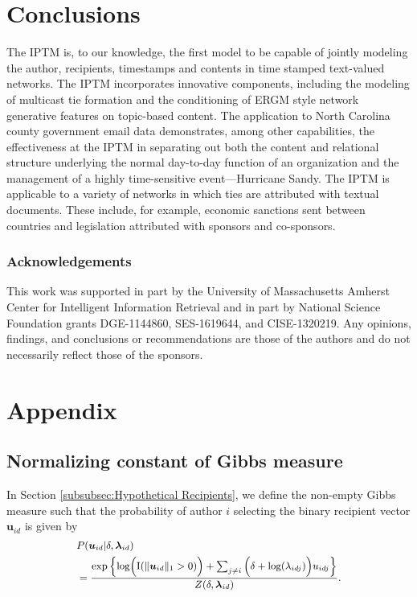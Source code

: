 \documentclass[twoside]{article}
\begin{document}
\section{Conclusions}\label{sec:Conclusions}
The IPTM is, to our knowledge, the first model to be capable of jointly modeling the author, recipients, timestamps and contents in time stamped text-valued networks. The IPTM incorporates innovative components, including the modeling of multicast tie formation and the conditioning of ERGM style network generative features on topic-based content. The application to North Carolina county government email data demonstrates, among other capabilities, the effectiveness at the IPTM in separating out both the content and relational structure underlying the normal day-to-day function of an organization and the management of a highly time-sensitive event---Hurricane Sandy. The IPTM is applicable to a variety of networks in which ties are attributed with textual documents. These include, for example, economic sanctions sent between countries and legislation attributed with sponsors and co-sponsors. 
\subsubsection*{Acknowledgements}
This work was supported in part by the University of Massachusetts Amherst Center for Intelligent Information Retrieval and in part by National Science Foundation grants DGE-1144860, SES-1619644, and CISE-1320219. Any opinions, findings, and conclusions or recommendations are those of the authors and do not necessarily reflect those of the sponsors.


\newpage
\appendix
\section*{Appendix}
\renewcommand{\thesubsection}{\Alph{subsection}}
  	 \subsection{Normalizing constant of Gibbs measure}\label{subsec: non-empty Gibbs measure}
  	 In Section \ref{subsubsec:Hypothetical Recipients}, we define the non-empty Gibbs measure such that the probability of author $i$ selecting the binary recipient vector $\boldsymbol{u}_{id}$ is given by
  	 \begin{equation*} 
  	 \footnotesize
  	 \begin{aligned}
  	& P(\boldsymbol{u}_{id}| \delta, \boldsymbol{\lambda}_{id} ) \\&= \frac{\exp\Big\{ \mbox{log}\Big(\text{I}(\lVert \boldsymbol{u}_{id} \rVert_1 > 0)\Big) + \sum_{j \neq i} \Big(\delta+\mbox{log}(\lambda_{idj})\Big)u_{idj} \Big\}}{Z(\delta,\boldsymbol{\lambda}_{id})}.
  	 \end{aligned}
  	 \end{equation*}
  	 
\end{document}

